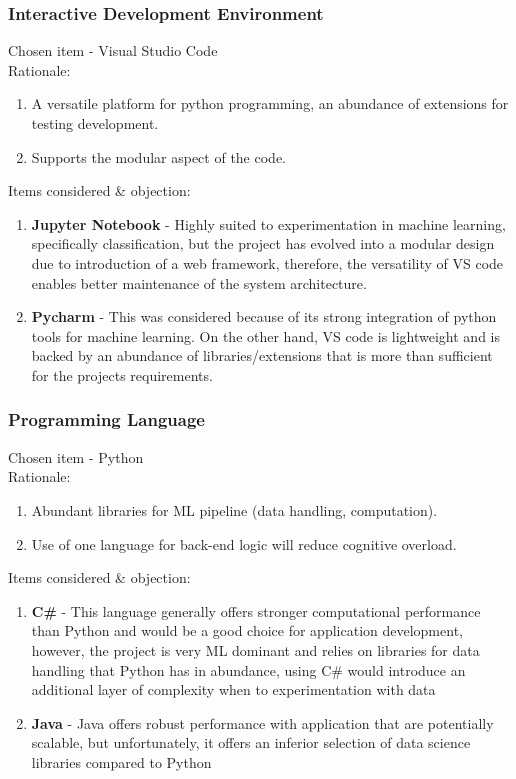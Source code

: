 \documentclass{article}
\begin{document}
\subsubsection{Interactive Development Environment}
Chosen item - Visual Studio Code \\
\large{Rationale:} \\
\begin{enumerate}
    \item A versatile platform for python programming, an abundance of extensions for testing development. 
    \item Supports the modular aspect of the code.
\end{enumerate}
\large{Items considered \& objection:} \\
\begin{enumerate}
    \item \textbf{Jupyter Notebook} - Highly suited to experimentation in machine learning, specifically classification, but the project has evolved into a modular design due to introduction of a web framework, therefore, the versatility of VS code enables better maintenance of the system architecture.
    \item \textbf{Pycharm} - This was considered because of its strong integration of python tools for machine learning. On the other hand, VS code is lightweight and is backed by an abundance of libraries/extensions that is more than sufficient for the projects requirements.
\end{enumerate}


\subsubsection{Programming Language}
Chosen item - Python \\
\large{Rationale:} \\
\begin{enumerate}
    \item Abundant libraries for ML pipeline (data handling, computation).
    \item Use of one language for back-end logic will reduce cognitive overload.
\end{enumerate}
\large{Items considered \& objection:} \\
\begin{enumerate}
    \item \textbf{C\#} - This language generally offers stronger computational performance than Python and would be a good choice for application development, however, the project is very ML dominant and relies on libraries for data handling that Python has in abundance, using C\# would introduce an additional layer of complexity when to experimentation with data %
    \item \textbf{Java} - Java offers robust performance with application that are potentially scalable, but unfortunately, it offers an inferior selection of data science libraries compared to Python
\end{enumerate}
\end{document}
